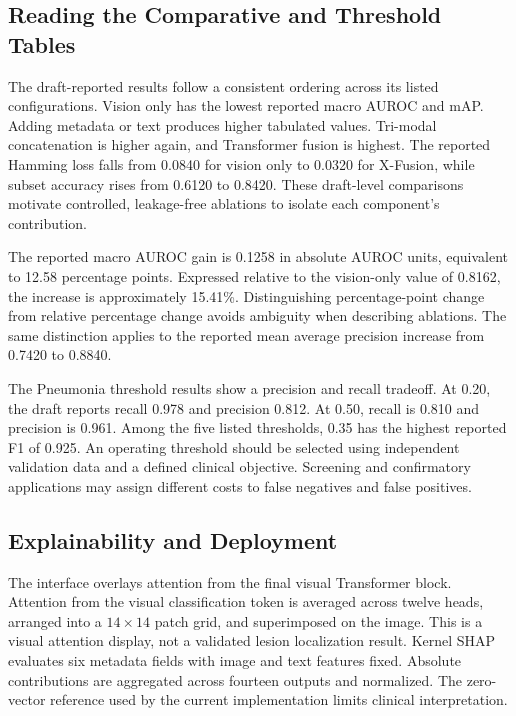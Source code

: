 \documentclass[pdflatex,sn-mathphys-num]{sn-jnl}
\begin{document}
\subsection{Reading the Comparative and Threshold Tables}

The draft-reported results follow a consistent ordering across its listed configurations. Vision only has the lowest reported macro AUROC and mAP. Adding metadata or text produces higher tabulated values. Tri-modal concatenation is higher again, and Transformer fusion is highest. The reported Hamming loss falls from 0.0840 for vision only to 0.0320 for X-Fusion, while subset accuracy rises from 0.6120 to 0.8420. These draft-level comparisons motivate controlled, leakage-free ablations to isolate each component's contribution.

The reported macro AUROC gain is 0.1258 in absolute AUROC units, equivalent to 12.58 percentage points. Expressed relative to the vision-only value of 0.8162, the increase is approximately 15.41\%. Distinguishing percentage-point change from relative percentage change avoids ambiguity when describing ablations. The same distinction applies to the reported mean average precision increase from 0.7420 to 0.8840.

The Pneumonia threshold results show a precision and recall tradeoff. At 0.20, the draft reports recall 0.978 and precision 0.812. At 0.50, recall is 0.810 and precision is 0.961. Among the five listed thresholds, 0.35 has the highest reported F1 of 0.925. An operating threshold should be selected using independent validation data and a defined clinical objective. Screening and confirmatory applications may assign different costs to false negatives and false positives.

\subsection{Explainability and Deployment}

The interface overlays attention from the final visual Transformer block. Attention from the visual classification token is averaged across twelve heads, arranged into a $14\times14$ patch grid, and superimposed on the image. This is a visual attention display, not a validated lesion localization result. Kernel SHAP evaluates six metadata fields with image and text features fixed. Absolute contributions are aggregated across fourteen outputs and normalized. The zero-vector reference used by the current implementation limits clinical interpretation.
\end{document}
